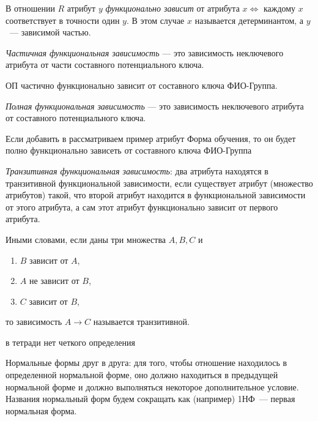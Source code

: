 \begin{definition}
  В отношении \(R\) атрибут \(y\) \textit{функционально зависит} от атрибута \(x \iff\)
  каждому \(x\) соответствует в точности один \(y\). В этом случае \(x\)
  называется детерминантом, а \(y\)~--- зависимой частью.
\end{definition}

\begin{definition}
  \textit{Частичная функциональная зависимость} --- это зависимость неключевого атрибута
  от части составного потенциального ключа.
\end{definition}

\begin{example}
  ОП частично функционально зависит от составного ключа ФИО-Группа.
\end{example}

\begin{definition}
  \textit{Полная функциональная зависимость} --- это зависимость неключевого атрибута от
  составного потенциального ключа.
\end{definition}

\begin{example}
  Если добавить в рассматриваем пример атрибут Форма обучения, то он будет полно
  функционально зависеть от составного ключа ФИО-Группа
\end{example}

\begin{definition}
  \textit{Транзитивная функциональная зависимость}: два атрибута находятся в транзитивной
  функциональной зависимости, если существует атрибут (множество атрибутов)
  такой, что второй атрибут находится в функциональной зависимости от этого
  атрибута, а сам этот атрибут функционально зависит от первого атрибута.

  Иными словами, если даны три множества \(A, B, C\) и
  \begin{enumerate}
    \item \(B\) зависит от \(A\),
    \item \(A\) не зависит от \(B\),
    \item \(C\) зависит от \(B\),
  \end{enumerate}
  то зависимость \(A \to C\) называется транзитивной. 

  \todo в тетради нет четкого определения
\end{definition}


Нормальные формы  друг в друга: для того, чтобы отношение
находилось в определенной нормальной форме, оно должно находиться в предыдущей
нормальной форме и должно выполняться некоторое дополнительное условие. Названия
нормальный форм будем сокращать как (например) 1НФ~--- первая нормальная форма.

